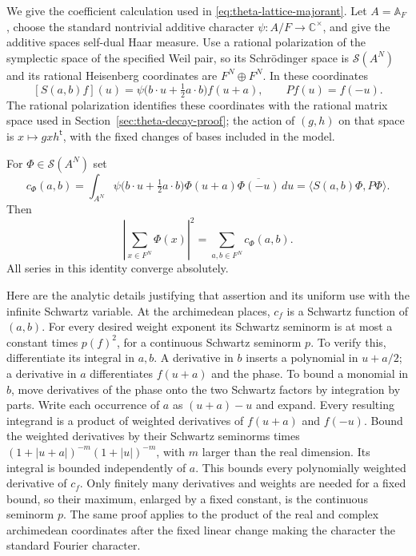 We give the coefficient calculation used in
\eqref{eq:theta-lattice-majorant}.
Let \(A=\mathbb A_F\), choose the standard nontrivial additive
character \(\psi:A/F\to\mathbb C^\times\), and give the additive
spaces self-dual Haar measure.  Use a rational polarization of
the symplectic space of the specified Weil pair, so its
Schr\"odinger space is \(\mathcal S(A^N)\) and its rational
Heisenberg coordinates are \(F^N\oplus F^N\).  In these coordinates
\[
 [S(a,b)f](u)=
 \psi\bigl(b\cdot u+\tfrac12 a\cdot b\bigr)f(u+a),
 \qquad Pf(u)=f(-u).
\]
The rational polarization identifies these coordinates with the
rational matrix space used in Section~\ref{sec:theta-decay-proof};
the action of \((g,h)\) on that space is
\(x\mapsto gx h^{\mathsf t}\), with the fixed changes of bases
included in the model.

For \(\Phi\in\mathcal S(A^N)\) set
\[
 c_\Phi(a,b)=
 \int_{A^N}\psi\bigl(b\cdot u+\tfrac12a\cdot b\bigr)
          \Phi(u+a)\overline{\Phi(-u)}\,du
 =\langle S(a,b)\Phi,P\Phi\rangle .
\]
Then
\begin{equation}\label{eq:sr-theta-square-coefficients}
 \left|\sum_{x\in F^N}\Phi(x)\right|^2
       =\sum_{a,b\in F^N}c_\Phi(a,b).
\end{equation}
All series in this identity converge absolutely.

Here are the analytic details justifying that assertion and its
uniform use with the infinite Schwartz variable.
At the archimedean places, \(c_f\) is a Schwartz function of \((a,b)\).
For every desired weight exponent its Schwartz seminorm is at most
a constant times \(p(f)^2\), for a continuous Schwartz seminorm \(p\).
To verify this, differentiate its integral in \(a,b\).
A derivative in \(b\) inserts a polynomial in \(u+a/2\);
a derivative in \(a\) differentiates \(f(u+a)\) and the phase.
To bound a monomial in \(b\), move derivatives of the phase onto
the two Schwartz factors by integration by parts.
Write each occurrence of \(a\) as \((u+a)-u\) and expand.
Every resulting integrand is a product of weighted derivatives of
\(f(u+a)\) and \(f(-u)\).
Bound the weighted derivatives by their Schwartz seminorms times
\((1+|u+a|)^{-m}(1+|u|)^{-m}\), with \(m\) larger than the real
dimension.  Its integral is bounded independently of \(a\).
This bounds every polynomially weighted derivative of \(c_f\).
Only finitely many derivatives and weights are needed for a fixed
bound, so their maximum, enlarged by a fixed constant, is the
continuous seminorm \(p\).
The same proof applies to the product of the real and complex
archimedean coordinates after the fixed linear change making the
character the standard Fourier character.

